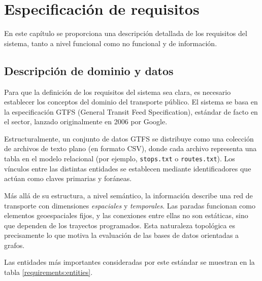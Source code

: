 
\chapter{Especificación de requisitos} \label{chapter:requirements}

En este capítulo se proporciona una descripción detallada de los requisitos del sistema, tanto a nivel funcional como no funcional y de información.

\section{Descripción de dominio y datos}

Para que la definición de los requisitos del sistema sea clara, es necesario establecer los conceptos del dominio del transporte público. El sistema se basa en la especificación GTFS\cite{gtfs} (General Transit Feed Specification), estándar de facto en el sector, lanzado originalmente en 2006 por Google.

Estructuralmente, un conjunto de datos GTFS se distribuye como una colección de archivos de texto plano (en formato CSV), donde cada archivo representa una tabla en el modelo relacional (por ejemplo, \texttt{stops.txt} o \texttt{routes.txt}). Los vínculos entre las distintas entidades se establecen mediante identificadores que actúan como claves primarias y foráneas.

Más allá de su estructura, a nivel semántico, la información describe una red de transporte con dimensiones \textit{espaciales} y \textit{temporales}. Las paradas funcionan como elementos geoespaciales fijos, y las conexiones entre ellas no son estáticas, sino que dependen de los trayectos programados. Esta naturaleza topológica es precisamente lo que motiva la evaluación de las bases de datos orientadas a grafos.

Las entidades más importantes consideradas por este estándar se muestran en la tabla \ref{requirements:entities}.

